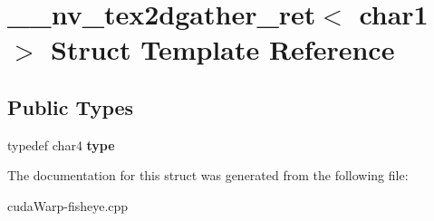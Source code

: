 \hypertarget{struct____nv__tex2dgather__ret_3_01char1_01_4}{}\section{\+\_\+\+\_\+nv\+\_\+tex2dgather\+\_\+ret$<$ char1 $>$ Struct Template Reference}
\label{struct____nv__tex2dgather__ret_3_01char1_01_4}
\subsection*{Public Types}
\begin{DoxyCompactItemize}
\item 
typedef char4 {\bfseries type}\hypertarget{struct____nv__tex2dgather__ret_3_01char1_01_4_ac602eac76530376d3e7368db912df939}{}\label{struct____nv__tex2dgather__ret_3_01char1_01_4_ac602eac76530376d3e7368db912df939}

\end{DoxyCompactItemize}


The documentation for this struct was generated from the following file\+:\begin{DoxyCompactItemize}
\item 
cuda\+Warp-\/fisheye.\+cpp\end{DoxyCompactItemize}
